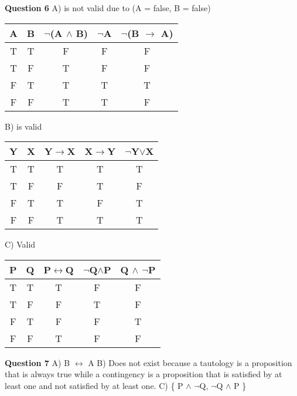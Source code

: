 \documentclass{article}
\begin{document}
\textbf{Question 6}\newline
A) is not valid due to (A = false, B = false) \newline
\begin{center}
\begin{tabular}{ |c|c||c|c||c| }
\hline
A & B & $\neg$(A $\wedge$ B) & $\neg$A & $\neg$(B $\rightarrow$ A)\\
\hline
T & T & F & F & F\\
T & F & T & F & F\\
F & T & T & T & T\\
F & F & T & T & F\\
\hline
\end{tabular}
\end{center}

B) is valid\newline

\begin{center}
\begin{tabular}{ |c|c||c|c||c| }
\hline
Y & X & Y$\rightarrow$X & X$\rightarrow$Y & $\neg$Y$\lor$X\\
\hline
T & T & T & T & T\\
T & F & F & T & F\\
F & T & T & F & T\\
F & F & T & T & T\\
\hline
\end{tabular}
\end{center}

C) Valid \newline

\begin{center}
\begin{tabular}{ |c|c||c|c||c| }
\hline
P & Q & P$\leftrightarrow$Q & $\neg$Q$\wedge$P & Q $\wedge$ $\neg$P\\
\hline
T & T & T & F & F\\
T & F & F & T & F\\
F & T & F & F & T\\
F & F & T & F & F\\
\hline
\end{tabular}
\end{center}

\textbf{Question 7}\newline
A) B $\leftrightarrow$ A\newline
B) Does not exist because a tautology is a proposition that is always true while a contingency is a proposition that is satisfied by at least one and not satisfied by at least one.\newline
C) \{ P $\wedge$ $\neg$Q, $\neg$Q $\wedge$ P \} \newline
\end{document}
